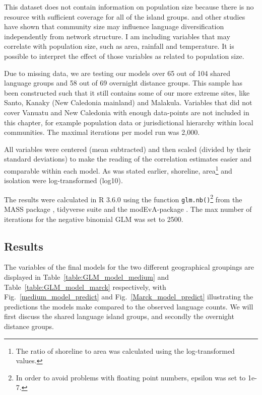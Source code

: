\documentclass[a4paper,10pt]{article} %
\begin{document}
This dataset does not contain information on population size because there is no resource with sufficient coverage for all of the island groups. \citet{raviv2019larger} and other studies have shown that community size may influence language diversification independently from network structure. I am including variables that may correlate with population size, such as area, rainfall and temperature. It is possible to interpret the effect of those variables as related to population size.

Due to missing data, we are testing our models over 65 out of 104 shared language groups and 58 out of 69 overnight distance groups. This sample has been constructed such that it still contains some of our more extreme sites, like Santo, Kanaky (New Caledonia mainland) and Malakula. Variables that did not cover Vanuatu and New Caledonia with enough data-points are not included in this chapter, for example population data or jurisdictional hierarchy within local communities. The maximal iterations per model run was 2,000.

All variables were centered (mean subtracted) and then scaled (divided by their standard deviations) to make the reading of the correlation estimates easier and comparable within each model. As was stated earlier, shoreline, area\footnote{The ratio of shoreline to area was calculated using the log-transformed values.} and isolation were log-transformed (log10).

The results were calculated in R 3.6.0 \citep{R} using the function \texttt{glm.nb()}\footnote{In order to avoid problems with floating point numbers, epsilon was set to 1e-7.} from the MASS package \citet{choi2014msstats}, tidyverse suite \citep{tidyverse13} and the modEvA-package \citep{barbosa2016package}. The max number of iterations for the negative binomial GLM was set to 2500.

\subsection{Results}
The variables of the final models for the two different geographical groupings are displayed in Table~\ref{table:GLM_model_medium} and Table~\ref{table:GLM_model_marck} respectively, with Fig.~\ref{medium_model_predict} and Fig.~\ref{Marck_model_predict} illustrating the predictions the models make compared to the observed language counts. We will first discuss the shared language island groups, and secondly the overnight distance groups.
\end{document}
